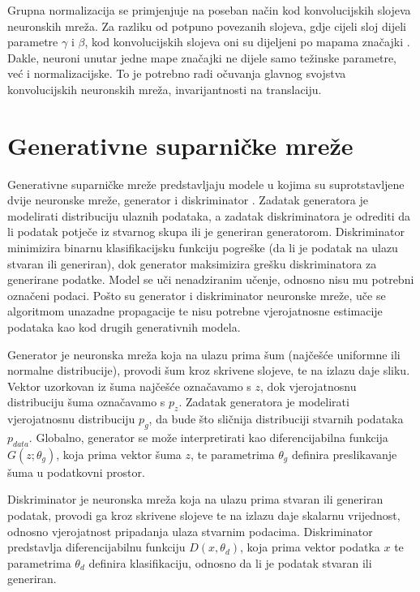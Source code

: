 \documentclass[times, utf8, diplomski]{fer}
\begin{document}
Grupna normalizacija se primjenjuje na poseban način kod konvolucijskih slojeva neuronskih mreža. Za razliku od potpuno povezanih slojeva, gdje cijeli sloj dijeli parametre $\gamma$ i $\beta$, kod konvolucijskih slojeva oni su dijeljeni po mapama značajki \cite{convbatchnorm}. Dakle, neuroni unutar jedne mape značajki ne dijele samo težinske parametre, već i normalizacijske. To je potrebno radi očuvanja glavnog svojstva konvolucijskih neuronskih mreža, invarijantnosti na translaciju.



\chapter{Generativne suparničke mreže}
Generativne suparničke mreže predstavljaju modele u kojima su suprotstavljene dvije neuronske mreže, generator i diskriminator \cite{GAN}. Zadatak generatora je modelirati distribuciju ulaznih podataka, a zadatak diskriminatora je odrediti da li podatak potječe iz stvarnog skupa ili je generiran generatorom. Diskriminator minimizira binarnu klasifikacijsku funkciju pogreške (da li je podatak na ulazu stvaran ili generiran), dok generator maksimizira grešku diskriminatora za generirane podatke. Model se uči nenadziranim učenje, odnosno nisu mu potrebni označeni podaci. Pošto su generator i diskriminator neuronske mreže, uče se algoritmom unazadne propagacije te nisu potrebne vjerojatnosne estimacije podataka kao kod drugih generativnih modela. \par

Generator je neuronska mreža koja na ulazu prima šum (najčešće uniformne ili normalne distribucije), provodi šum kroz skrivene slojeve, te na izlazu daje sliku. Vektor uzorkovan iz šuma najčešće označavamo s $z$, dok vjerojatnosnu distribuciju šuma označavamo s $p_z$. Zadatak generatora je modelirati vjerojatnosnu distribuciju $p_g$, da bude što sličnija distribuciji stvarnih podataka $p_ {data}$. Globalno, generator se može interpretirati kao diferencijabilna funkcija $G(z; \theta_g)$, koja prima vektor šuma $z$, te parametrima $\theta_g$ definira preslikavanje šuma u podatkovni prostor. \par

Diskriminator je neuronska mreža koja na ulazu prima stvaran ili generiran podatak, provodi ga kroz skrivene slojeve te na izlazu daje skalarnu vrijednost, odnosno vjerojatnost pripadanja ulaza stvarnim podacima. Diskriminator predstavlja diferencijabilnu funkciju $D(x, \theta_d)$, koja prima vektor podatka $x$ te parametrima $\theta_d$ definira klasifikaciju, odnosno da li je podatak stvaran ili generiran. \par
\end{document}

